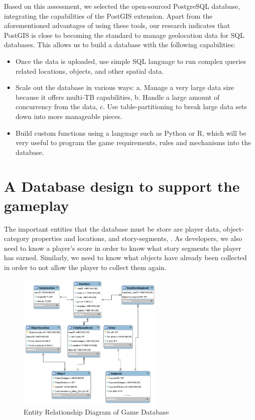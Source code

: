 \documentclass[conference]{IEEEtran}
\begin{document}
Based on this assessment, we selected the open-sourced PostgreSQL database, integrating the capabilities of the PostGIS extension. Apart from the aforementioned advantages of using these tools, our research indicates that PostGIS is close to becoming the standard to manage geolocation data for SQL databases.  This allows us to build a database with the following capabilities:

\begin{itemize}
\item	Once the data is uploaded, use simple SQL language to run complex queries related locations, objects, and other spatial data. 
\item Scale out the database in various ways: a. Manage a very large data size because it offers multi-TB capabilities, b. Handle a large amount of concurrency from the data, c. Use table-partitioning to break large data sets down into more manageable pieces.
\item Build custom functions using a language such as Python or R, which will be very useful to program the game requirements, rules and mechanisms into the database. 
\end{itemize}

\section{A Database design to support the gameplay}

The important entities that the database must be store are player data, object-category properties and locations, and story-segments, . As developers, we also need to know a player’s score in order to know what story segments the player has earned. Similarly, we need to know what objects have already been collected in order to not allow the player to collect them again. 

\begin{figure}[h]
\centering
\includegraphics[width=2.8in]{imgs/DatabaseSchema.png}
\caption{Entity Relationship Diagram of Game Database}
\label{ERD}
\end{figure}
\end{document}
